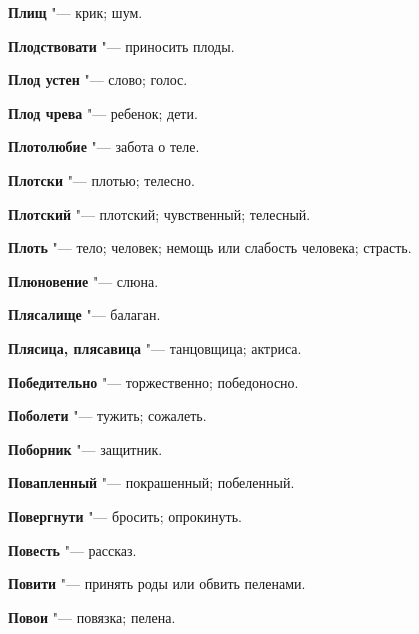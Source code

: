 \begin{mymulticols}{2}
\noindent\textbf{Плищ} "--- крик; шум. 




\noindent\textbf{Плодствовати} "--- приносить плоды. 




\noindent\textbf{Плод устен} "--- слово; голос. 




\noindent\textbf{Плод чрева} "--- ребенок; дети. 




\noindent\textbf{Плотолюбие} "--- забота о теле. 




\noindent\textbf{Плотски} "--- плотью; телесно. 




\noindent\textbf{Плотский} "--- плотский; чувственный; телесный. 




\noindent\textbf{Плоть} "--- тело; человек; немощь или слабость человека; страсть. 




\noindent\textbf{Плюновение} "--- слюна. 




\noindent\textbf{Плясалище} "--- балаган. 




\noindent\textbf{Плясица, плясавица} "--- танцовщица; актриса. 




\noindent\textbf{Победительно} "--- торжественно; победоносно. 




\noindent\textbf{Поболети} "--- тужить; сожалеть. 




\noindent\textbf{Поборник} "--- защитник. 




\noindent\textbf{Повапленный} "--- покрашенный; побеленный. 




\noindent\textbf{Повергнути} "--- бросить; опрокинуть. 




\noindent\textbf{Повесть} "--- рассказ. 




\noindent\textbf{Повити} "--- принять роды или обвить пеленами. 




\noindent\textbf{Повои} "--- повязка; пелена. 





\end{mymulticols}
